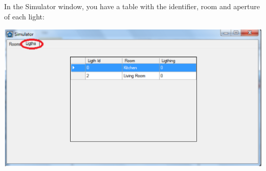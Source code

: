 In the Simulator window, you have a table with the identifier, room and aperture of each light:
\begin{center}
	\includegraphics[width=.75\linewidth]{images/simulatorLight.eps}
	\\
\vspace{1cm}
\end{center}